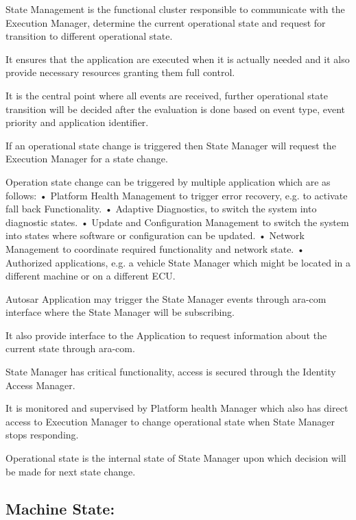 \begin{DoxyItemize}
\item State Management is the functional cluster responsible to communicate with the Execution Manager, determine the current operational state and request for transition to different operational state.
\item It ensures that the application are executed when it is actually needed and it also provide necessary resources granting them full control.
\item It is the central point where all events are received, further operational state transition will be decided after the evaluation is done based on event type, event priority and application identifier.
\item If an operational state change is triggered then State Manager will request the Execution Manager for a state change.
\item Operation state change can be triggered by multiple application which are as follows\+: • Platform Health Management to trigger error recovery, e.\+g. to activate fall back Functionality. • Adaptive Diagnostics, to switch the system into diagnostic states. • Update and Configuration Management to switch the system into states where software or configuration can be updated. • Network Management to coordinate required functionality and network state. • Authorized applications, e.\+g. a vehicle State Manager which might be located in a different machine or on a different E\+CU.
\item Autosar Application may trigger the State Manager events through ara-\/com interface where the State Manager will be subscribing.
\item It also provide interface to the Application to request information about the current state through ara-\/com.
\item State Manager has critical functionality, access is secured through the Identity Access Manager.
\item It is monitored and supervised by Platform health Manager which also has direct access to Execution Manager to change operational state when State Manager stops responding.
\item Operational state is the internal state of State Manager upon which decision will be made for next state change.
\end{DoxyItemize}

\subsection*{Machine State\+:}


